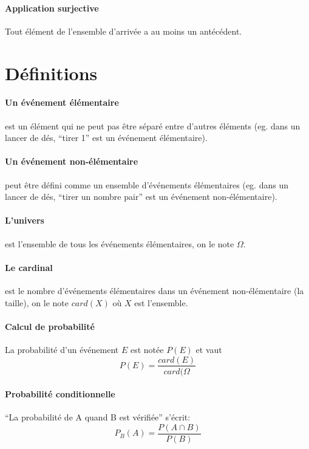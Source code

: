 \documentclass[10pt,a4paper,french]{article}
\begin{document}
\paragraph{Application surjective}
Tout élément de l'ensemble d'arrivée a au moins un antécédent.

\section{Définitions}

\paragraph{Un événement élémentaire} est un élément qui ne peut pas être séparé entre d'autres éléments (eg. dans un lancer de dés, ``tirer 1'' est un événement élémentaire).

\paragraph{Un événement non-élémentaire} peut être défini comme un ensemble d'événements élémentaires (eg. dans un lancer de dés, ``tirer un nombre pair'' est un événement non-élémentaire).

\paragraph{L'univers} est l'ensemble de tous les événements élémentaires, on le note $\Omega$.

\paragraph{Le cardinal} est le nombre d'événements élémentaires dans un événement non-élémentaire (la taille), on le note $card(X)$ où $X$ est l'ensemble.

\paragraph{Calcul de probabilité} La probabilité d'un événement $E$ est notée $P(E)$ et vaut \[ P(E) = \frac{card(E)}{card(\Omega} \]

\paragraph{Probabilité conditionnelle}
``La probabilité de A quand B est vérifiée'' s'écrit: \[ P_B(A)=\frac{P(A \cap B)}{P(B)} \]
\end{document}

